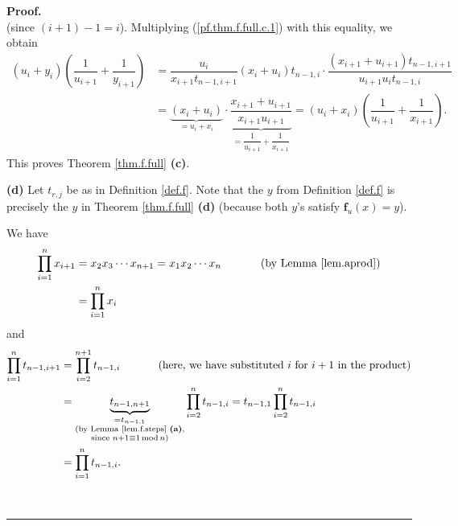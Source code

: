 \documentclass[numbers=enddot,12pt,final,onecolumn,notitlepage]{scrartcl}%
\theoremstyle{definition}
\newenvironment{proof}[1][Proof]{\noindent\textbf{#1.} }{\ \rule{0.5em}{0.5em}}
\let\prodnonlimits\prod
\renewcommand{\prod}{\prodnonlimits\limits}
\begin{document}
\begin{proof}
\[\]
(since $\left(  i+1\right)  -1=i$). Multiplying (\ref{pf.thm.f.full.c.1}) with
this equality, we obtain%
\begin{align*}
\left(  u_{i}+y_{i}\right)  \left(  \dfrac{1}{u_{i+1}}+\dfrac{1}{y_{i+1}%
}\right)   &  =\dfrac{u_{i}}{x_{i+1}t_{n-1,i+1}}\left(  x_{i}+u_{i}\right)
t_{n-1,i}\cdot\dfrac{\left(  x_{i+1}+u_{i+1}\right)  t_{n-1,i+1}}{u_{i+1}%
u_{i}t_{n-1,i}}\\
&  =\underbrace{\left(  x_{i}+u_{i}\right)  }_{=u_{i}+x_{i}}\cdot
\underbrace{\dfrac{x_{i+1}+u_{i+1}}{x_{i+1}u_{i+1}}}_{=\dfrac{1}{u_{i+1}%
}+\dfrac{1}{x_{i+1}}}=\left(  u_{i}+x_{i}\right)  \left(  \dfrac{1}{u_{i+1}%
}+\dfrac{1}{x_{i+1}}\right)  .
\end{align*}
This proves Theorem \ref{thm.f.full} \textbf{(c)}.

\textbf{(d)} Let $t_{r,j}$ be as in Definition \ref{def.f}. Note that the $y$
from Definition \ref{def.f} is precisely the $y$ in Theorem \ref{thm.f.full}
\textbf{(d)} (because both $y$'s satisfy $\mathbf{f}_{u}\left(  x\right)  =y$).

We have
\begin{align}
\prod_{i=1}^{n}x_{i+1}  &  =x_{2}x_{3}\cdots x_{n+1}=x_{1}x_{2}\cdots
x_{n}\ \ \ \ \ \ \ \ \ \ \left(  \text{by Lemma \ref{lem.aprod}}\right)
\nonumber\\
&  =\prod_{i=1}^{n}x_{i} \label{pf.thm.f.full.d.1}%
\end{align}
and%
\begin{align}
\prod_{i=1}^{n}t_{n-1,i+1}  &  =\prod_{i=2}^{n+1}t_{n-1,i}%
\ \ \ \ \ \ \ \ \ \ \left(  \text{here, we have substituted }i\text{ for
}i+1\text{ in the product}\right) \nonumber\\
&  =\underbrace{t_{n-1,n+1}}_{\substack{=t_{n-1,1}\\\text{(by Lemma
\ref{lem.f.steps} \textbf{(a)},}\\\text{since }n+1\equiv1\operatorname{mod}%
n\text{)}}}\prod_{i=2}^{n}t_{n-1,i}=t_{n-1,1}\prod_{i=2}^{n}t_{n-1,i}%
\nonumber\\
&  =\prod_{i=1}^{n}t_{n-1,i}. \label{pf.thm.f.full.d.2}%
\end{align}



\end{proof}
\end{document}
